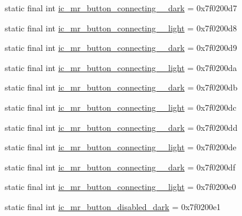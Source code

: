 \begin{CompactItemize}
\item 
static final int \hyperlink{classandroid_1_1support_1_1graphics_1_1drawable_1_1animated_1_1_r_1_1drawable_a0c248e36fc76f5fc6276605f776f81a}{ic\_\-mr\_\-button\_\-connecting\_\_\-dark} = 0x7f0200d7
\item 
static final int \hyperlink{classandroid_1_1support_1_1graphics_1_1drawable_1_1animated_1_1_r_1_1drawable_4eb496e797c4248c1ac1ce11bbf0da06}{ic\_\-mr\_\-button\_\-connecting\_\_\-light} = 0x7f0200d8
\item 
static final int \hyperlink{classandroid_1_1support_1_1graphics_1_1drawable_1_1animated_1_1_r_1_1drawable_85e648a5d8f1c0e8dda80d73dcad61db}{ic\_\-mr\_\-button\_\-connecting\_\_\-dark} = 0x7f0200d9
\item 
static final int \hyperlink{classandroid_1_1support_1_1graphics_1_1drawable_1_1animated_1_1_r_1_1drawable_530d7dbfa1c2ae5f5ba6e63ecd9695e5}{ic\_\-mr\_\-button\_\-connecting\_\_\-light} = 0x7f0200da
\item 
static final int \hyperlink{classandroid_1_1support_1_1graphics_1_1drawable_1_1animated_1_1_r_1_1drawable_372b7f5e8c46755d7728c727143a69b0}{ic\_\-mr\_\-button\_\-connecting\_\_\-dark} = 0x7f0200db
\item 
static final int \hyperlink{classandroid_1_1support_1_1graphics_1_1drawable_1_1animated_1_1_r_1_1drawable_f2ef8b847460ae765b345da4dccd3af7}{ic\_\-mr\_\-button\_\-connecting\_\_\-light} = 0x7f0200dc
\item 
static final int \hyperlink{classandroid_1_1support_1_1graphics_1_1drawable_1_1animated_1_1_r_1_1drawable_34ee516874be58449f67f760947c3b5f}{ic\_\-mr\_\-button\_\-connecting\_\_\-dark} = 0x7f0200dd
\item 
static final int \hyperlink{classandroid_1_1support_1_1graphics_1_1drawable_1_1animated_1_1_r_1_1drawable_93ac5d1cfa046db401a59354d64eb735}{ic\_\-mr\_\-button\_\-connecting\_\_\-light} = 0x7f0200de
\item 
static final int \hyperlink{classandroid_1_1support_1_1graphics_1_1drawable_1_1animated_1_1_r_1_1drawable_8e4b22c6256f8806359c84b245707db1}{ic\_\-mr\_\-button\_\-connecting\_\_\-dark} = 0x7f0200df
\item 
static final int \hyperlink{classandroid_1_1support_1_1graphics_1_1drawable_1_1animated_1_1_r_1_1drawable_43e6053ffbc911d03de56fc203873a02}{ic\_\-mr\_\-button\_\-connecting\_\_\-light} = 0x7f0200e0
\item 
static final int \hyperlink{classandroid_1_1support_1_1graphics_1_1drawable_1_1animated_1_1_r_1_1drawable_5b63d1c9da17cf24488e196880a601fd}{ic\_\-mr\_\-button\_\-disabled\_\-dark} = 0x7f0200e1

\end{CompactItemize}
